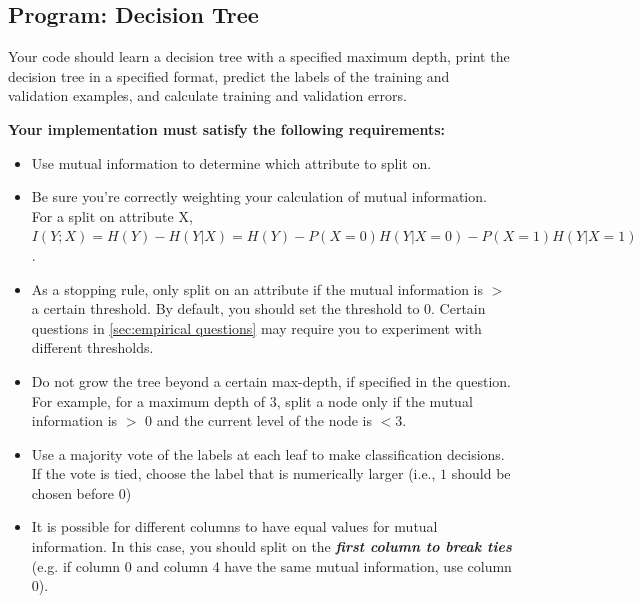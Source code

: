 \subsection{Program: Decision Tree}
\label{sec:decisiontree}

Your code should learn a decision tree with a specified maximum depth, print the decision tree in a specified format, predict the labels of the training and validation examples, and calculate training and validation errors.

\newpage
\textbf{Your implementation must satisfy the following requirements:}
\begin{itemize}
\item Use mutual information to determine which attribute to split on.
\item Be sure you’re correctly weighting your calculation of mutual information. For a split on attribute X, $I(Y;X) = H(Y)-H(Y|X) = H(Y) - P(X=0)H(Y|X = 0) - P(X = 1)H(Y|X = 1)$.
\item As a stopping rule, only split on an attribute if the mutual information is $>$ a certain threshold. By default, you should set the threshold to $0$. Certain questions in \ref{sec:empirical questions} may require you to experiment with different thresholds.
\item Do not grow the tree beyond a certain max-depth, if specified in the question. For example, for a maximum depth of 3, split a node only if the mutual information is $>$ 0 and the current level of the node is $< 3$.
\item Use a majority vote of the labels at each leaf to make classification decisions. If the vote is tied, choose the label that is numerically larger (i.e., $1$ should be chosen before $0$)
\item It is possible for different columns to have equal values for mutual information. In this case, you should split on the \emph{\textbf{first column to break ties}} (e.g. if column 0 and column 4 have the same mutual information, use column 0).
\end{itemize}


